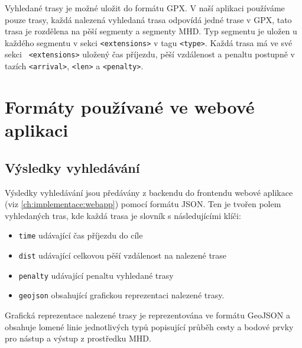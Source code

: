 Vyhledané trasy je možné uložit do formátu GPX\cite{GPX}. V naší aplikaci používáme pouze trasy, každá
nalezená vyhledaná trasa odpovídá jedné trase v GPX, tato trasa je rozdělena na
pěší segmenty a segmenty MHD. Typ segmentu je uložen u každého segmentu v sekci
{\tt <extensions>} v tagu {\tt <type>}. Každá trasa má ve své sekci {\tt
<extensions>} uložený čas příjezdu, pěší vzdálenost a penaltu postupně v tazích
{\tt <arrival>}, {\tt <len>} a {\tt <penalty>}.

\section{Formáty používané ve webové aplikaci}
\subsection{Výsledky vyhledávání}
Výsledky vyhledávání jsou předávány z backendu do frontendu webové aplikace
(viz \ref{ch:implementace:webapp}) pomocí formátu JSON. Ten je tvořen polem vyhledaných
tras, kde každá trasa je slovník s následujícími klíči:
\begin{itemize}
	\item {\tt time} udávající čas příjezdu do cíle
	\item {\tt dist} udávající celkovou pěší vzdálenost na nalezené trase
	\item {\tt penalty} udávající penaltu vyhledané trasy
	\item {\tt geojson} obsahující grafickou reprezentaci nalezené trasy. 
\end{itemize}
Grafická reprezentace nalezené trasy je reprezentována ve formátu GeoJSON a
obsahuje lomené linie jednotlivých typů popisující průběh cesty a bodové prvky
pro nástup a výstup z prostředku MHD.

